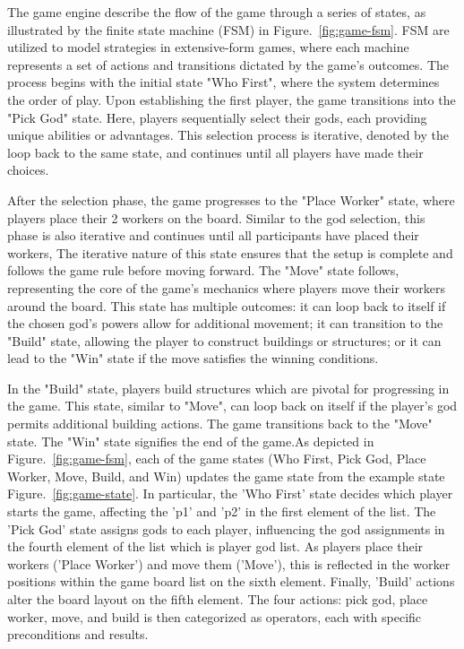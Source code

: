 \documentclass{telkomnika}
\begin{document}
The game engine describe the flow of the game through a series of states, 
as illustrated by the finite state machine (FSM) in Figure.~\ref{fig:game-fsm}. 
FSM are utilized to model strategies in extensive-form games, where each machine represents a set of actions and transitions dictated by the game's outcomes\cite{Cerny2020}.  
The process begins with the initial state "Who First", where the system determines the order of play. 
Upon establishing the first player, the game transitions into the "Pick God" state. 
Here, players sequentially select their gods, each providing unique abilities or advantages. 
This selection process is iterative, denoted by the loop back to the same state, and continues until all players have made their choices.

After the selection phase, the game progresses to the "Place Worker" state, where players place their 2 workers on the board. Similar to the god selection, this phase is also iterative and continues until all participants have placed their workers, The iterative nature of this state ensures that the setup is complete and follows the game rule before moving forward. The "Move" state follows, representing the core of the game's mechanics where players move their workers around the board. This state has multiple outcomes: it can loop back to itself if the chosen god's powers allow for additional movement; it can transition to the "Build" state, allowing the player to construct buildings or structures; or it can lead to the "Win" state if the move satisfies the winning conditions.

In the "Build" state, players build structures which are pivotal for progressing in the game. This state, similar to "Move", can loop back on itself if the player's god permits additional building actions. The game transitions back to the "Move" state. The "Win" state signifies the end of the game.As depicted in Figure.~\ref{fig:game-fsm}, each of the game states (Who First, Pick God, Place Worker, Move, Build, and Win) updates the game state from the example state Figure.~\ref{fig:game-state}. In particular, the 'Who First' state decides which player starts the game, affecting the 'p1' and 'p2' in the first element of the list. The 'Pick God' state assigns gods to each player, influencing the god assignments in the fourth element of the list which is player god list. As players place their workers ('Place Worker') and move them ('Move'), this is reflected in the worker positions within the game board list on the sixth element. 
Finally, 'Build' actions alter the board layout on the fifth element.
The four actions: pick god, place worker, move, and build is then categorized as operators, 
each with specific preconditions and results. 
\end{document}
